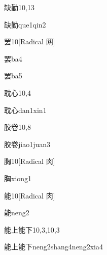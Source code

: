 \begin{entry}{缺勤}{10,13}
  \begin{phonetics}{缺勤}{que1qin2}
  \end{phonetics}
\end{entry}

\begin{entry}{罢}{10}[Radical 网]
  \begin{phonetics}{罢}{ba4}
  \end{phonetics}
  \begin{phonetics}{罢}{ba5}
  \end{phonetics}
\end{entry}

\begin{entry}{耽心}{10,4}
  \begin{phonetics}{耽心}{dan1xin1}
  \end{phonetics}
\end{entry}

\begin{entry}{胶卷}{10,8}
  \begin{phonetics}{胶卷}{jiao1juan3}
  \end{phonetics}
\end{entry}

\begin{entry}{胸}{10}[Radical 肉]
  \begin{phonetics}{胸}{xiong1}
  \end{phonetics}
\end{entry}

\begin{entry}{能}{10}[Radical 肉]
  \begin{phonetics}{能}{neng2}
  \end{phonetics}
\end{entry}

\begin{entry}{能上能下}{10,3,10,3}
  \begin{phonetics}{能上能下}{neng2shang4neng2xia4}
  \end{phonetics}
\end{entry}

